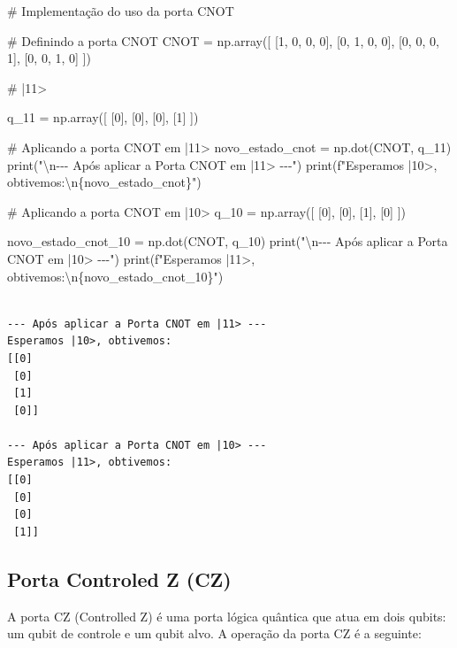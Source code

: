 \documentclass[
  brazilian,
]{report}
\newenvironment{Shaded}{\begin{snugshade}}{\end{snugshade}}
\newcommand{\NormalTok}[1]{\textcolor[rgb]{0.00,0.23,0.31}{#1}}
\begin{document}
\begin{Shaded}
\begin{Highlighting}[]

\NormalTok{\# Implementação do uso da porta CNOT}

\NormalTok{\# Definindo a porta CNOT}
\NormalTok{CNOT = np.array([}
\NormalTok{    [1, 0, 0, 0],}
\NormalTok{    [0, 1, 0, 0],}
\NormalTok{    [0, 0, 0, 1],}
\NormalTok{    [0, 0, 1, 0]}
\NormalTok{])  }

\NormalTok{\# |11\textgreater{} }

\NormalTok{q\_11 = np.array([}
\NormalTok{    [0],}
\NormalTok{    [0],}
\NormalTok{    [0],}
\NormalTok{    [1]}
\NormalTok{])}

\NormalTok{\# Aplicando a porta CNOT em |11\textgreater{}}
\NormalTok{novo\_estado\_cnot = np.dot(CNOT, q\_11)}
\NormalTok{print("\textbackslash{}n{-}{-}{-} Após aplicar a Porta CNOT em |11\textgreater{} {-}{-}{-}")}
\NormalTok{print(f"Esperamos |10\textgreater{}, obtivemos:\textbackslash{}n\{novo\_estado\_cnot\}")}

\NormalTok{\# Aplicando a porta CNOT em |10\textgreater{}}
\NormalTok{q\_10 = np.array([}
\NormalTok{    [0],}
\NormalTok{    [0],}
\NormalTok{    [1],}
\NormalTok{    [0]}
\NormalTok{])}

\NormalTok{novo\_estado\_cnot\_10 = np.dot(CNOT, q\_10)}
\NormalTok{print("\textbackslash{}n{-}{-}{-} Após aplicar a Porta CNOT em |10\textgreater{} {-}{-}{-}")}
\NormalTok{print(f"Esperamos |11\textgreater{}, obtivemos:\textbackslash{}n\{novo\_estado\_cnot\_10\}")}
\end{Highlighting}
\end{Shaded}

\begin{verbatim}

--- Após aplicar a Porta CNOT em |11> ---
Esperamos |10>, obtivemos:
[[0]
 [0]
 [1]
 [0]]

--- Após aplicar a Porta CNOT em |10> ---
Esperamos |11>, obtivemos:
[[0]
 [0]
 [0]
 [1]]
\end{verbatim}

\subsection{Porta Controled Z (CZ)}\label{porta-controled-z-cz}

A porta CZ (Controlled Z) é uma porta lógica quântica que atua em dois
qubits: um qubit de controle e um qubit alvo. A operação da porta CZ é a
seguinte:
\end{document}
